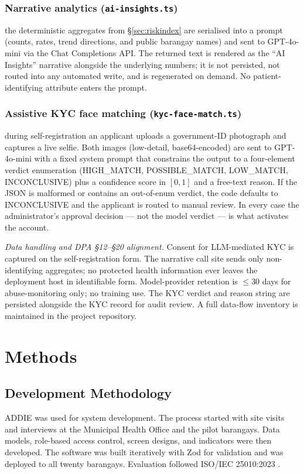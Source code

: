 \documentclass[conference]{IEEEtran}
\begin{document}
\subsubsection{Narrative analytics (\texttt{ai-insights.ts})} the deterministic aggregates from \S\ref{sec:riskindex} are serialised into a prompt (counts, rates, trend directions, and public barangay names) and sent to GPT-4o-mini via the Chat Completions API. The returned text is rendered as the ``AI Insights'' narrative alongside the underlying numbers; it is not persisted, not routed into any automated write, and is regenerated on demand. No patient-identifying attribute enters the prompt.

\subsubsection{Assistive KYC face matching (\texttt{kyc-face-match.ts})} during self-registration an applicant uploads a government-ID photograph and captures a live selfie. Both images (low-detail, base64-encoded) are sent to GPT-4o-mini with a fixed system prompt that constrains the output to a four-element verdict enumeration (HIGH\_MATCH, POSSIBLE\_MATCH, LOW\_MATCH, INCONCLUSIVE) plus a confidence score in $[0,1]$ and a free-text reason. If the JSON is malformed or contains an out-of-enum verdict, the code defaults to INCONCLUSIVE and the applicant is routed to manual review. In every case the administrator's approval decision --- not the model verdict --- is what activates the account.

\textit{Data handling and DPA \S 12--\S 20 alignment.} Consent for LLM-mediated KYC is captured on the self-registration form. The narrative call site sends only non-identifying aggregates; no protected health information ever leaves the deployment host in identifiable form. Model-provider retention is $\leq 30$ days for abuse-monitoring only; no training use. The KYC verdict and reason string are persisted alongside the KYC record for audit review. A full data-flow inventory is maintained in the project repository.

\section{Methods}

\subsection{Development Methodology}
ADDIE was used for system development. The process started with site visits and interviews at the Municipal Health Office and the pilot barangays. Data models, role-based access control, screen designs, and indicators were then developed. The software was built iteratively with Zod \cite{b46} for validation and was deployed to all twenty barangays. Evaluation followed ISO/IEC 25010:2023 \cite{b31}.
\end{document}
